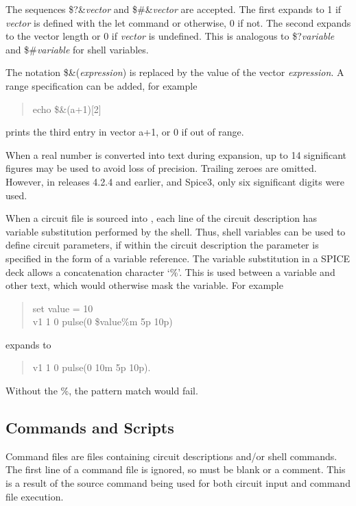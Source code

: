 The sequences {\vt \$?\&}{\it vector} and {\vt \$\#\&}{\it vector} are
accepted.  The first expands to 1 if {\it vector} is defined with the
{\cb let} command or otherwise, 0 if not.  The second expands to the
vector length or 0 if {\it vector} is undefined.  This is analogous to
{\vt \$?}{\it variable} and {\vt \$\#}{\it variable} for shell
variables.

The notation {\vt \$\&}({\it expression\/}) is replaced by the value
of the vector {\it expression\/}.  A range specification can be added,
for example
\begin{quote}
\vt echo \$\&(a+1)[2]
\end{quote}
prints the third entry in vector {\vt a+1}, or 0 if out of range.

When a real number is converted into text during expansion, up to 14
significant figures may be used to avoid loss of precision.  Trailing
zeroes are omitted.  However, in releases 4.2.4 and earlier, and
Spice3, only six significant digits were used.

When a circuit file is sourced into {\WRspice}, each line of the
circuit description has variable substitution performed by the shell. 
Thus, shell variables can be used to define circuit parameters, if
within the circuit description the parameter is specified in the form
of a variable reference.  The variable substitution in a SPICE deck
allows a concatenation character `{\vt \%}'.  This is used between a
variable and other text, which would otherwise mask the variable.  For
example
\begin{quote}\vt
set value = 10\\
v1 1 0 pulse(0 \$value\%m 5p 10p)
\end{quote}
expands to
\begin{quote}\vt
v1 1 0 pulse(0 10m 5p 10p).
\end{quote}
Without the {\vt \%}, the pattern match would fail.

\subsection{Commands and Scripts}


Command files are files containing circuit descriptions and/or shell
commands.  The first line of a command file is ignored, so must be
blank or a comment.  This is a result of the {\cb source} command
being used for both circuit input and command file execution.

